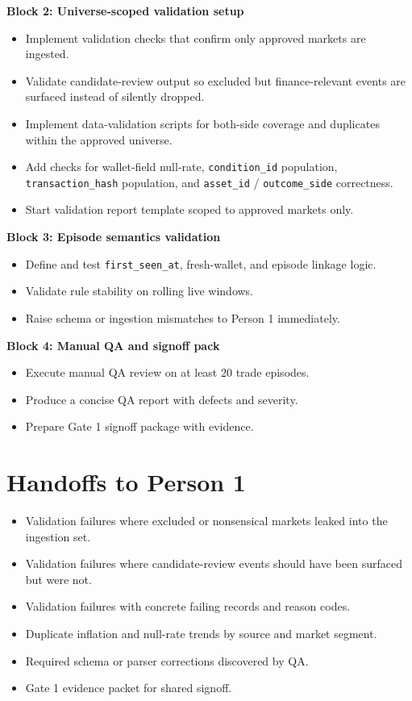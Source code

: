 \documentclass{article}
\begin{document}
\textbf{Block 2: Universe-scoped validation setup}
\begin{itemize}
\item Implement validation checks that confirm only approved markets are ingested.
\item Validate candidate-review output so excluded but finance-relevant events are surfaced instead of silently dropped.
\item Implement data-validation scripts for both-side coverage and duplicates within the approved universe.
\item Add checks for wallet-field null-rate, \texttt{condition\_id} population, \texttt{transaction\_hash} population, and \texttt{asset\_id} / \texttt{outcome\_side} correctness.
\item Start validation report template scoped to approved markets only.
\end{itemize}

\textbf{Block 3: Episode semantics validation}
\begin{itemize}
\item Define and test \texttt{first\_seen\_at}, fresh-wallet, and episode linkage logic.
\item Validate rule stability on rolling live windows.
\item Raise schema or ingestion mismatches to Person 1 immediately.
\end{itemize}

\textbf{Block 4: Manual QA and signoff pack}
\begin{itemize}
\item Execute manual QA review on at least 20 trade episodes.
\item Produce a concise QA report with defects and severity.
\item Prepare Gate 1 signoff package with evidence.
\end{itemize}

\section*{Handoffs to Person 1}
\begin{itemize}
\item Validation failures where excluded or nonsensical markets leaked into the ingestion set.
\item Validation failures where candidate-review events should have been surfaced but were not.
\item Validation failures with concrete failing records and reason codes.
\item Duplicate inflation and null-rate trends by source and market segment.
\item Required schema or parser corrections discovered by QA.
\item Gate 1 evidence packet for shared signoff.
\end{itemize}
\end{document}
